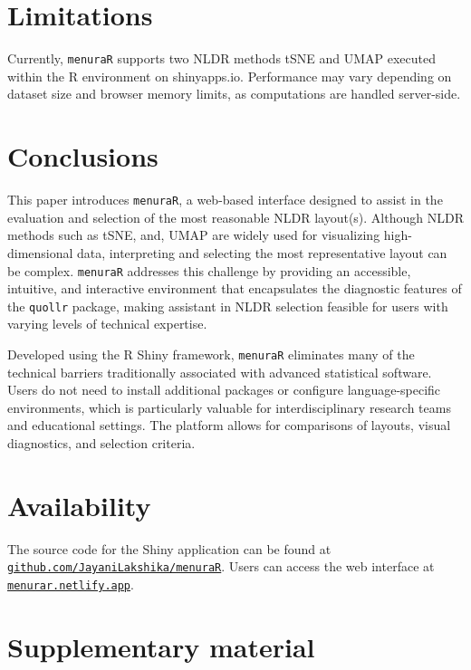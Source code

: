 \documentclass[
  11pt,
  a4paper,
]{report}
\begin{document}
\section{Limitations}\label{limitations}

Currently, \texttt{menuraR} supports two NLDR methods tSNE and UMAP
executed within the R environment on shinyapps.io. Performance may vary
depending on dataset size and browser memory limits, as computations are
handled server-side.

\section{Conclusions}\label{conclusions}

This paper introduces \texttt{menuraR}, a web-based interface designed
to assist in the evaluation and selection of the most reasonable NLDR
layout(s). Although NLDR methods such as tSNE, and, UMAP are widely used
for visualizing high-dimensional data, interpreting and selecting the
most representative layout can be complex. \texttt{menuraR} addresses
this challenge by providing an accessible, intuitive, and interactive
environment that encapsulates the diagnostic features of the
\texttt{quollr} package, making assistant in NLDR selection feasible for
users with varying levels of technical expertise.

Developed using the R Shiny framework, \texttt{menuraR} eliminates many
of the technical barriers traditionally associated with advanced
statistical software. Users do not need to install additional packages
or configure language-specific environments, which is particularly
valuable for interdisciplinary research teams and educational settings.
The platform allows for comparisons of layouts, visual diagnostics, and
selection criteria.

\section{Availability}\label{availability}

The source code for the Shiny application can be found at
\href{https://github.com/JayaniLakshika/menuraR}{\texttt{github.com/JayaniLakshika/menuraR}}.
Users can access the web interface at
\href{https://menurar.netlify.app/}{\texttt{menurar.netlify.app}}.

\section{Supplementary material}\label{supplementary-material}
\end{document}
